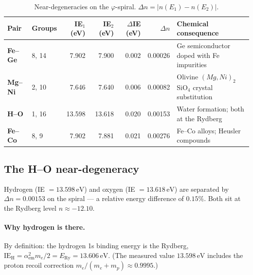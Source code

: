 \documentclass[11pt,a4paper]{article}
\theoremstyle{definition}
\theoremstyle{remark}
\newcommand{\vp}{\varphi}
\newcommand{\ERy}{E_{\mathrm{Ry}}}
\newcommand{\aem}{\alpha_{\mathrm{em}}}
\newcommand{\IE}{\mathrm{IE}}
\begin{document}
\begin{table}[h]
\centering
\caption{Near-degeneracies on the $\vp$-spiral.
  $\Delta n = |n(E_1) - n(E_2)|$.}
\label{P11:tab:degen}
\begin{tabular}{llrrrrp{4.5cm}}
\toprule
Pair & Groups & IE$_1$ (eV) & IE$_2$ (eV) & $\Delta$IE (eV)
  & $\Delta n$ & Chemical consequence \\
\midrule
\textbf{Fe--Ge} & 8, 14 & 7.902 & 7.900 & 0.002 & 0.00026
  & Ge semiconductor doped with Fe impurities \\
\textbf{Mg--Ni} & 2, 10 & 7.646 & 7.640 & 0.006 & 0.00082
  & Olivine $(Mg,Ni)_2$SiO$_4$ crystal substitution \\
\textbf{H--O} & 1, 16 & 13.598 & 13.618 & 0.020 & 0.00153
  & Water formation; both at the Rydberg \\
\textbf{Fe--Co} & 8, 9 & 7.902 & 7.881 & 0.021 & 0.00276
  & Fe--Co alloys; Heusler compounds \\
\bottomrule
\end{tabular}
\end{table}

\subsection{The H--O near-degeneracy}
\label{P11:subsec:ho}

Hydrogen (IE $= 13.598\,\mathrm{eV}$) and oxygen (IE $= 13.618\,\mathrm{eV}$)
are separated by $\Delta n = 0.00153$ on the spiral
--- a relative energy difference of $0.15\%$.
Both sit at the Rydberg level $n \approx -12.10$.

\paragraph{Why hydrogen is there.}
By definition: the hydrogen 1s binding energy is the Rydberg,
$\IE_\mathrm{H} = \aem^2 m_e/2 = \ERy = 13.606\,\mathrm{eV}$.
(The measured value $13.598\,\mathrm{eV}$ includes the
proton recoil correction $m_e/(m_e + m_p) \approx 0.9995$.)
\end{document}
